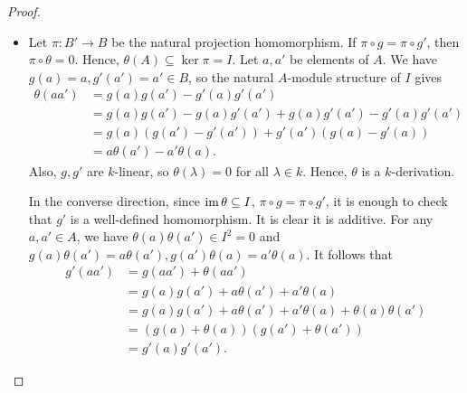 \documentclass[a4paper]{article}
\begin{document}
\begin{enumerate} [label=\textbf{\arabic*.}, leftmargin=0em]
          \begin{proof} $ $ \vspace{0pt}
              \begin{itemize} [leftmargin=0cm]
                  \item[(a)] Let $\pi : B' \to B$ be the natural projection homomorphism. If $\pi \circ g = \pi \circ g'$, then $\pi \circ \theta = 0$. Hence, $\theta(A) \subseteq \ker{\pi} = I$. Let $a, a'$ be elements of $A$. We have $g(a) = a, g'(a') = a' \in B$, so the natural $A$-module structure of $I$ gives
                        \begin{align*}
                            \theta(aa') & = g(a)g(a') - g'(a)g'(a')                               \\
                                        & = g(a) g(a') - g(a) g'(a') + g(a) g'(a') - g'(a) g'(a') \\
                                        & = g(a) (g(a') - g'(a')) + g'(a')(g(a) - g'(a))          \\
                                        & = a \theta(a') - a' \theta(a).
                        \end{align*}
                        Also, $g, g'$ are $k$-linear, so $\theta(\lambda) = 0$ for all $\lambda \in k$. Hence, $\theta$ is a $k$-derivation.

                        In the converse direction, since $\operatorname{im}{\theta} \subseteq I$, $\pi \circ g = \pi \circ g'$, it is enough to check that $g'$ is a well-defined homomorphism.
                        It is clear it is additive.
                        For any $a, a' \in A$, we have $\theta(a)\theta(a') \in I^2 = 0$ and $g(a)\theta(a') = a\theta(a'), g(a')\theta(a) = a'\theta(a)$.
                        It follows that
                        \begin{align*}
                            g'(aa') & = g(aa') + \theta(aa')                                         \\
                                    & = g(a)g(a') + a\theta(a') + a'\theta(a)                        \\
                                    & = g(a)g(a') + a\theta(a') + a'\theta(a) + \theta(a) \theta(a') \\
                                    & = (g(a) + \theta(a))(g(a') + \theta(a'))                       \\
                                    & = g'(a)g'(a').
                        \end{align*}


\end{itemize}
\end{proof}
\end{enumerate}
\end{document}

